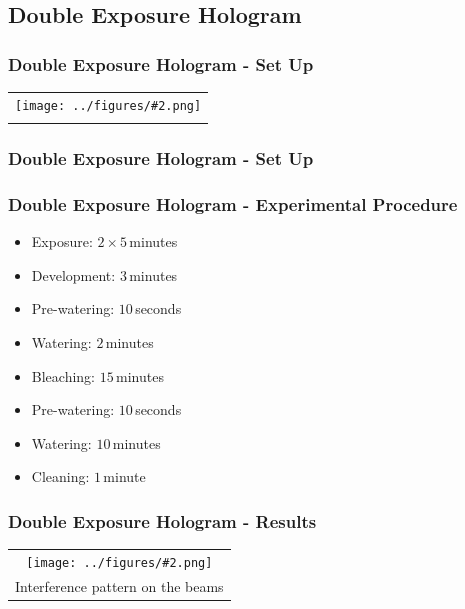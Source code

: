 \documentclass{beamer}
\newcommand{\gra}[3][]{
	\begin{table}
	\centering
	\begin{tabular}[width=\textwidth]{c}
		\texttt{[image: ../figures/\#2.png]}\\
		\small #3
	\end{tabular}
	\end{table}
}
\newcommand{\graThree}[6][0.49]{
	\begin{tabular}[width=\textwidth]{ccc}
		\texttt{[image: ../figures/\#2.png]}&
		\texttt{[image: ../figures/\#3.png]}&
		\texttt{[image: ../figures/\#4.png]}&
		\captionof{figure}[#5]{#6}
	\end{tabular}
}
\begin{document}
\subsection{Double Exposure Hologram}
\frame{\tableofcontents[currentsubsection]}
\begin{frame}
	\frametitle{Double Exposure Hologram - Set Up}
	\gra[0.85]{Versuchsaufbau_2}{}%
\end{frame}
\begin{frame}
	\frametitle{Double Exposure Hologram - Set Up}
	\begin{figure}
		\centering
	\end{figure}
\end{frame}
\begin{frame}
	\frametitle{Double Exposure Hologram - Experimental Procedure}
	\begin{itemize}
		\item Exposure: $2\times5\,$minutes
		\item Development: $3\,$minutes
		\item Pre-watering: $10\,$seconds
		\item Watering: $2\,$minutes
		\item Bleaching: $15\,$minutes
		\item Pre-watering: $10\,$seconds
		\item Watering: $10\,$minutes
		\item Cleaning: $1\,$minute
	\end{itemize}
\end{frame}

\begin{frame}
	\frametitle{Double Exposure Hologram - Results}
	\gra[0.8]{staebe4}{Interference pattern on the beams}
\end{frame}
\end{document}
